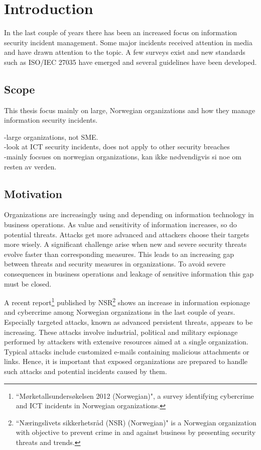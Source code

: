 \chapter{Introduction}
In the last couple of years there has been an increased focus on information security incident management. Some major incidents received attention in media and have drawn attention to the topic. A few surveys exist and new standards such as ISO/IEC 27035 have emerged and several guidelines have been developed.

\section{Scope}
This thesis focus mainly on large, Norwegian organizations and how they manage information security incidents.

-large organizations, not SME.\\
-look at ICT security incidents, does not apply to other security breaches\\
-mainly focsues on norwegian organizations, kan ikke nødvendigvis si noe om resten av verden.

\section{Motivation}
Organizations are increasingly using and depending on information technology in business operations. As value and sensitivity of information increases, so do potential threats. Attacks get more advanced and attackers choose their targets more wisely. A significant challenge arise when new and severe security threats evolve faster than corresponding measures. This leads to an increasing gap between threats and security measures in organizations. To avoid severe consequences in business operations and leakage of sensitive information this gap must be closed.

A recent report\footnote{``Mørketallsundersøkelsen 2012 (Norwegian)", a survey identifying cybercrime and \ac{ICT} incidents in Norwegian organizations.} published by NSR\footnote{``Næringslivets sikkerhetsråd (NSR) (Norwegian)" is a Norwegian organization with objective to prevent crime in and against business by presenting security threats and trends.} shows an increase in information espionage and cybercrime among Norwegian organizations in the last couple of years\cite{Morketall2012}. Especially targeted attacks, known as advanced persistent threats, appears to be increasing. These attacks involve industrial, political and military espionage performed by attackers with extensive resources aimed at a single organization. Typical attacks include customized e-mails containing malicious attachments or links. Hence, it is important that exposed organizations are prepared to handle such attacks and potential incidents caused by them. 

